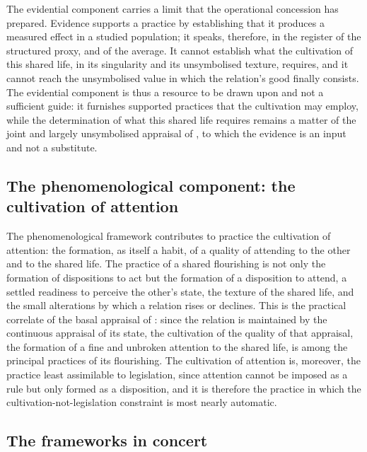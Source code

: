 The evidential component carries a limit that the operational concession has prepared. Evidence supports a practice by establishing that it produces a measured effect in a studied population; it speaks, therefore, in the register of the structured proxy, and of the average. It cannot establish what the cultivation of this shared life, in its singularity and its unsymbolised texture, requires, and it cannot reach the unsymbolised value in which the relation's good finally consists. The evidential component is thus a resource to be drawn upon and not a sufficient guide: it furnishes supported practices that the cultivation may employ, while the determination of what this shared life requires remains a matter of the joint and largely unsymbolised appraisal of , to which the evidence is an input and not a substitute.

\subsection{The phenomenological component: the cultivation of attention}
\label{p11:sec:prac-phenom}

The phenomenological framework contributes to practice the cultivation of attention: the formation, as itself a habit, of a quality of attending to the other and to the shared life. The practice of a shared flourishing is not only the formation of dispositions to act but the formation of a disposition to attend, a settled readiness to perceive the other's state, the texture of the shared life, and the small alterations by which a relation rises or declines. This is the practical correlate of the basal appraisal of : since the relation is maintained by the continuous appraisal of its state, the cultivation of the quality of that appraisal, the formation of a fine and unbroken attention to the shared life, is among the principal practices of its flourishing. The cultivation of attention is, moreover, the practice least assimilable to legislation, since attention cannot be imposed as a rule but only formed as a disposition, and it is therefore the practice in which the cultivation-not-legislation constraint is most nearly automatic.

\subsection{The frameworks in concert}
\label{p11:sec:prac-concert}

